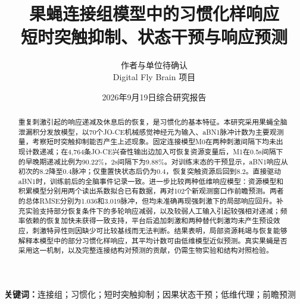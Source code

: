 \documentclass[UTF8,a4paper,zihao=-4,fontset=none]{ctexart}
\title{\bfseries 果蝇连接组模型中的习惯化样响应\\[.4em]\Large 短时突触抑制、状态干预与响应预测}
\author{作者与单位待确认\\\small Digital Fly Brain 项目}
\date{2026年9月19日\quad 综合研究报告}
\begin{document}
\maketitle\thispagestyle{fancy}
\begin{abstract}
重复刺激引起的响应递减及休息后的恢复，是习惯化的基本特征。本研究采用果蝇全脑泄漏积分发放模型，以70个JO-CE机械感觉神经元为输入、aBN1脉冲计数为主要观测量，考察短时突触抑制能否产生上述现象。固定连接模型M0在两种刺激间隔下均未出现计数递减；在4,764条JO-CE兴奋性输出边加入可恢复资源变量后，M1在0.5s间隔下的早晚期递减比例为90.22\%，2s间隔下为9.88\%。对训练末态的干预显示，aBN1响应从初次的8.2降至0.4脉冲；仅重置快状态后仍为0.4，恢复突触资源后回到8.2。直接驱动aBN1时，训练前后的全脑事件记录一致。进一步比较两种低维响应模型：资源模型和积累模型分别用两个读出系数拟合已有数据，再对102个新观测窗口作前瞻预测。两者的总体RMSE分别为1.036和3.019脉冲，但均未准确再现强刺激下的局部响应回升。补充实验支持部分恢复条件下的多轮响应减弱，以及较弱人工输入引起较强相对递减；频率依赖的恢复加快未获得一致支持，平台后追加刺激和两种替代刺激均未产生预设效应，刺激特异性则因缺少可比较基线而无法判断。结果表明，局部资源耗竭与恢复能够解释本模型中的部分习惯化样响应，其平均计数可由低维模型近似预测。真实果蝇是否采用这一机制，以及完整连接结构对预测的贡献，仍需生物实验和结构对照检验。
\end{abstract}
\noindent\textbf{关键词：}连接组；习惯化；短时突触抑制；因果状态干预；低维代理；前瞻预测
\clearpage
\begingroup\small\linespread{0.98}\selectfont
\tableofcontents
\endgroup\clearpage





\bigskip
{}
{\small{}\setlength{\bibsep}{3pt}}
\clearpage\appendix

\end{document}
